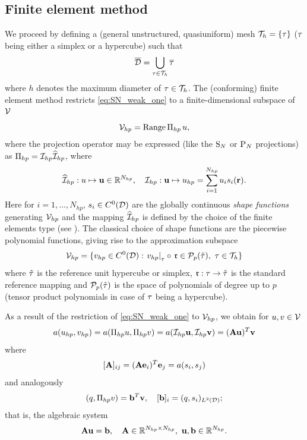 \subsection{Finite element method}\label{sec:FEM}
We proceed by defining a (general unstructured, quasiuniform) mesh
$\mesh = \{\elem\}$ ($\elem$ being either a simplex or a hypercube) such that $$
	\overline{\VV} = \bigcup_{\elem\in\mesh} \overline\elem
$$ where $h$ denotes
the maximum diameter of $\elem\in\mesh$. The (conforming) finite element
method restricts \eqref{eq:SN_weak_one} to a finite-dimensional subspace of $\Space$
\begin{equation}\label{eq:mesh}
	\Space_{hp} = \Rng \Projop[hp]\,u,
\end{equation}
where the projection operator may be expressed (like the $\SN$ or $\PN$ projections) as 
$\Projop[hp] = \PiHP\PihHP$, where
$$
	\PihHP : u \mapsto \mathbf{u} \in \R[N_{hp}], \quad \PiHP : \mathbf{u} \mapsto u_{hp} = \sum_{i=1}^{N_{hp}} u_i
	s_i(\br).
$$
Here for $i = 1,\ldots,N_{hp}$, $s_i \in C^0(\VV)$ are the globally continuous \textit{shape functions} generating
$\Space_{hp}$ and the mapping $\PihHP$ is defined by the choice of the finite
elements type (see \cite[Chap. 3]{dolfin1}).
The classical choice of shape functions are the piecewise polynomial functions, giving rise to the approximation
subspace
\begin{equation}\label{eq:space}
	\Space_{hp} = \{v_{hp} \in C^0(\VV): \left. v_{hp}\right\vert_{\elem} \circ\, \mathfrak{r} \in
	\mathcal{P}_p(\hat{\elem}),\ \elem\in\mesh
	\}
\end{equation}
where $\hat{\elem}$ is the reference unit hypercube or simplex, $\mathfrak{r} : \elem \to \hat{\elem} $
is the standard reference mapping and $\mathcal{P}_p(\hat{\elem})$ is the space of polynomials of degree up to $p$
(tensor product polynomials in case of $\elem$ being a hypercube).

As a result of the restriction of \eqref{eq:SN_weak_one} to $\Space_{hp}$, we obtain for $u,v\in\Space$
\begin{equation}\label{eq:aaa}
	a(u_{hp}, v_{hp}) = a(\Projop[hp]u, \Projop[hp]v) = a(\PiHP \mathbf{u}, \PiHP \mathbf{v}) =
	(\mathbf{A}\mathbf{u})^T\mathbf{v}
\end{equation}
where
$$
	[\mat{A}]_{ij} = (\mat{A}\mat{e}_i)^T\mat{e}_j = a(s_i, s_j) 
$$
and analogously 
$$
	(q,\Projop[hp] v) = \mat{b}^T \mat{v}, \quad [\mat{b}]_i = (q, s_i)_{\Lp[2](\VV)};
$$
that is, the algebraic system
$$
	\mathbf{A}\mathbf{u} = \mathbf{b},\quad \mathbf{A} \in \R[N_{hp}\times N_{hp}], \ \mat{u},\mat{b} \in \R[N_{hp}].
$$


